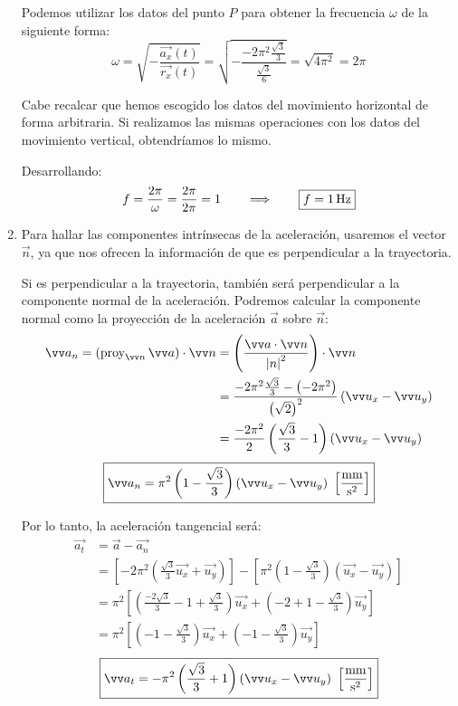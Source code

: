 \documentclass[a4paper]{book}
\begin{document}
\begin{enumerate}[label = \arabic*)]
	 Podemos utilizar los datos del punto $P$ para obtener la frecuencia $\omega$ de la siguiente forma:
	 \[ \omega = \sqrt{- \frac{\vec{a_x}(t)}{\vec{r_x}(t)}} = \sqrt{- \frac{-2\pi^2 \frac{\sqrt{3}}{3}}{\frac{\sqrt{3}}{6}}} = \sqrt{4\pi^2} = 2\pi \]
	 
	 Cabe recalcar que hemos escogido los datos del movimiento horizontal de forma arbitraria. Si realizamos las mismas operaciones con los datos del movimiento vertical, obtendríamos lo mismo.
	 
	 Desarrollando:
	 \[ f = \frac{2\pi}{\omega} = \frac{2\pi}{2\pi} = 1 \qquad \Longrightarrow \qquad \boxed{f = 1 \operatorname{Hz}} \]

	 \item Para hallar las componentes intrínsecas de la aceleración, usaremos el vector $\vec{n}$, ya que nos ofrecen la información de que es perpendicular a la trayectoria.
	 
	 Si es perpendicular a la trayectoria, también será perpendicular a la componente normal de la aceleración. Podremos calcular la componente normal como la proyección de la aceleración $\vec{a}$ sobre $\vec{n}$:
	 \begin{align*}
		 \vec{a_n} = \left( \proy{a}{n} \right)\cdot \vec{n} &=\left(\frac{\vec{a}\cdot \vec{n}}{\abs{n}^2} \right)\cdot \vec{n}\\
		 &=\frac{-2\pi^2 \frac{\sqrt{3}}{3} - \left( -2\pi^2 \right)}{\left( \sqrt{2} \right)^2}\left( \vec{u_x} - \vec{u_y}\right)\\
		 &= \frac{-2\pi^2}{2} \left( \frac{\sqrt{3}}{3}-1 \right)\left( \vec{u_x} - \vec{u_y} \right)
	 \end{align*} 
	 \[\boxed{\vec{a_n} = \pi^2\left( 1-\frac{\sqrt{3}}{3} \right)\left( \vec{u_x} - \vec{u_y}\right) \ \left[ \frac{\mm}{\s^2} \right]}\]

	 Por lo tanto, la aceleración tangencial será:
	 \begin{align*}
		 \vec{a_t} &= \vec{a} - \vec{a_n}\\ 
	 	 &= \left[ -2\pi^2 \left( \frac{\sqrt{3}}{3}\vec{u_x} + \vec{u_y} \right) \right] - \left[ \pi^2 \left( 1-\frac{\sqrt{3}}{3} \right)\left( \vec{u_x} - \vec{u_y}\right) \right]\\
		 &= \pi^2 \left[ \left( \frac{-2 \sqrt{3}}{3} -1 + \frac{\sqrt{3}}{3} \right) \vec{u_x} + \left( -2 +1 -\frac{\sqrt{3}}{3} \right)\vec{u_y}\right]\\
		 &= \pi^2 \left[ \left( -1 - \frac{\sqrt{3}}{3} \right) \vec{u_x} + \left( -1 -\frac{\sqrt{3}}{3} \right)\vec{u_y}\right]
	 \end{align*}
	 \[ \boxed{\vec{a_t} = -\pi^2 \left( \frac{\sqrt{3}}{3} + 1 \right)\left( \vec{u_x} - \vec{u_y} \right) \ \left[ \frac{\mm}{\s^2} \right]}\]

\end{enumerate}
\end{document}
